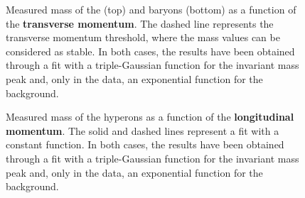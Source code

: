 \begin{figure}[!p]
\hspace*{-2.cm}
\caption{Measured mass of the \rmXi (top) and \rmOmega baryons (bottom) as a function of the \textbf{transverse momentum}. The dashed line represents the transverse momentum threshold, where the mass values can be considered as stable. In both cases, the results have been obtained through a fit with a triple-Gaussian function for the invariant mass peak and, only in the data, an exponential function for the background.}
	\label{fig:MassVsPt}
\end{figure}

\begin{figure}[!p]
\hspace*{-2.cm}
\caption{Measured mass of the \rmXi hyperons as a function of the \textbf{longitudinal momentum}. The solid and dashed lines represent a fit with a constant function. In both cases, the results have been obtained through a fit with a triple-Gaussian function for the invariant mass peak and, only in the data, an exponential function for the background.}
	\label{fig:MassXiVsPz}
\end{figure}


